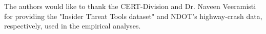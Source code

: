 \documentclass[letterpaper]{article}
\begin{document}
The authors would like to thank the CERT-Division and Dr. Naveen Veeramisti for providing the "Insider Threat Tools dataset" and NDOT's highway-crash data, respectively, used in the empirical analyses. 










\end{document}
